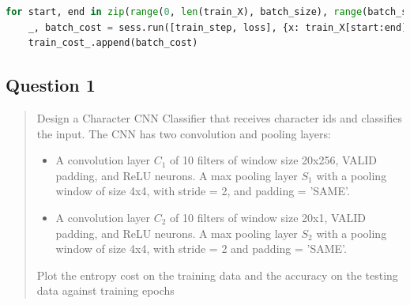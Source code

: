 \begin{lstlisting}[language=Python, caption= Mini-batch setup, label=ls:mini_batch]
for start, end in zip(range(0, len(train_X), batch_size), range(batch_size, len(train_X), batch_size)):
    _, batch_cost = sess.run([train_step, loss], {x: train_X[start:end], y_: train_Y[start:end]})
    train_cost_.append(batch_cost)
\end{lstlisting}

\subsection{Question 1}
\label{2q1}
\begin{quote}
Design a Character CNN Classifier that receives character ids and classifies the input. The CNN has two convolution and pooling layers:
\begin{itemize}
    \item A convolution layer $C_1$ of 10 filters of window size 20x256, VALID padding, and ReLU neurons. A max pooling layer $S_1$ with a pooling window of size 4x4, with stride = 2, and padding = 'SAME'.
    \item A convolution layer $C_2$ of 10 filters of window size 20x1, VALID padding, and ReLU neurons. A max pooling layer $S_2$ with a pooling window of size 4x4, with stride = 2 and padding = 'SAME'.
\end{itemize}
Plot the entropy cost on the training data and the accuracy on the testing data against training
epochs
\end{quote}

